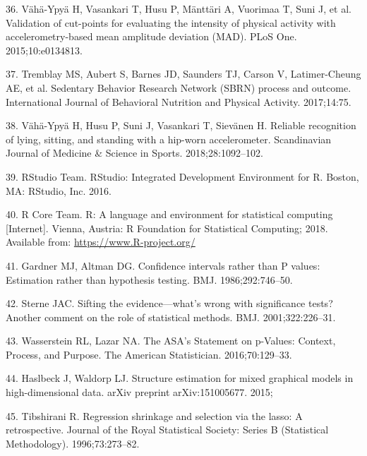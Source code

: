 \documentclass[english,man,floatsintext]{apa6}
\begin{document}
\leavevmode\hypertarget{ref-vaha-ypyaValidationCutpointsEvaluating2015}{}%
36. Vähä-Ypyä H, Vasankari T, Husu P, Mänttäri A, Vuorimaa T, Suni J, et al. Validation of cut-points for evaluating the intensity of physical activity with accelerometry-based mean amplitude deviation (MAD). PLoS One. 2015;10:e0134813.

\leavevmode\hypertarget{ref-tremblaySedentaryBehaviorResearch2017}{}%
37. Tremblay MS, Aubert S, Barnes JD, Saunders TJ, Carson V, Latimer-Cheung AE, et al. Sedentary Behavior Research Network (SBRN) process and outcome. International Journal of Behavioral Nutrition and Physical Activity. 2017;14:75.

\leavevmode\hypertarget{ref-vaha-ypyaReliableRecognitionLying2018}{}%
38. Vähä-Ypyä H, Husu P, Suni J, Vasankari T, Sievänen H. Reliable recognition of lying, sitting, and standing with a hip-worn accelerometer. Scandinavian Journal of Medicine \& Science in Sports. 2018;28:1092--102.

\leavevmode\hypertarget{ref-rstudioteamRStudioIntegratedDevelopment2016}{}%
39. RStudio Team. RStudio: Integrated Development Environment for R. Boston, MA: RStudio, Inc. 2016.

\leavevmode\hypertarget{ref-R-base}{}%
40. R Core Team. R: A language and environment for statistical computing {[}Internet{]}. Vienna, Austria: R Foundation for Statistical Computing; 2018. Available from: \url{https://www.R-project.org/}

\leavevmode\hypertarget{ref-gardnerConfidenceIntervalsRather1986}{}%
41. Gardner MJ, Altman DG. Confidence intervals rather than P values: Estimation rather than hypothesis testing. BMJ. 1986;292:746--50.

\leavevmode\hypertarget{ref-sterneSiftingEvidenceWhat2001}{}%
42. Sterne JAC. Sifting the evidence---what's wrong with significance tests? Another comment on the role of statistical methods. BMJ. 2001;322:226--31.

\leavevmode\hypertarget{ref-wassersteinASAStatementPValues2016}{}%
43. Wasserstein RL, Lazar NA. The ASA's Statement on p-Values: Context, Process, and Purpose. The American Statistician. 2016;70:129--33.

\leavevmode\hypertarget{ref-haslbeckStructureEstimationMixed2015}{}%
44. Haslbeck J, Waldorp LJ. Structure estimation for mixed graphical models in high-dimensional data. arXiv preprint arXiv:151005677. 2015;

\leavevmode\hypertarget{ref-tibshiraniRegressionShrinkageSelection1996}{}%
45. Tibshirani R. Regression shrinkage and selection via the lasso: A retrospective. Journal of the Royal Statistical Society: Series B (Statistical Methodology). 1996;73:273--82.
\end{document}
